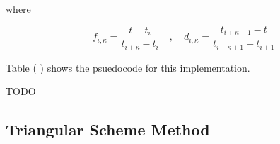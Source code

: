 \documentclass{article}
\begin{document}
\hspace{1cm}

where

\begin{equation}
    f_{i,\kappa} = \frac{t - t_i}{t_{i+\kappa}- t_i} \quad , \quad d_{i,\kappa} = \frac{t_{i+\kappa+1} - t}{t_{i+\kappa+1}-t_{i+1}}
\end{equation}

\hspace{1cm}

Table ( ) shows the psuedocode for this implementation.

TODO

\subsection{Triangular Scheme Method}
\end{document}
